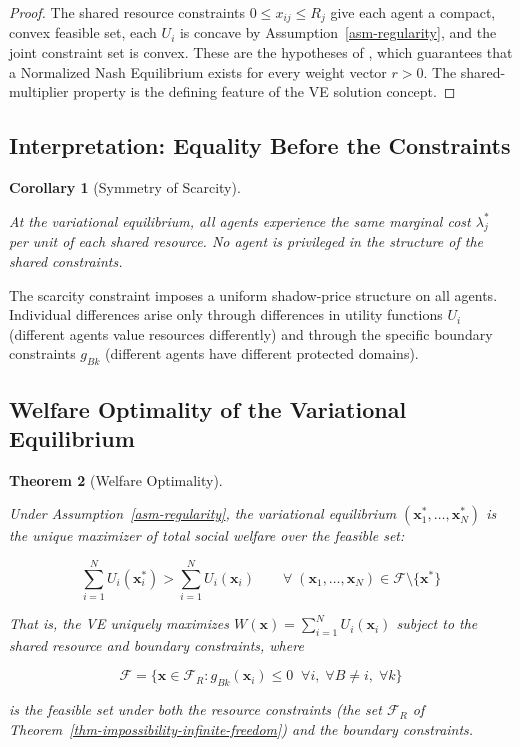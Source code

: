 \documentclass[11pt]{article}
\theoremstyle{plain}
\newtheorem{theorem}{Theorem}
\newtheorem{corollary}[theorem]{Corollary}
\theoremstyle{definition}
\theoremstyle{remark}
\let\origsubsection\subsection
\renewcommand{\subsection}{\needspace{7\baselineskip}\origsubsection}
\begin{document}
\begin{proof}
The shared resource constraints $0 \leq x_{ij} \leq R_j$ give each agent a compact, convex feasible set, each $U_i$ is concave by Assumption~\ref{asm-regularity}, and the joint constraint set is convex. These are the hypotheses of \citep[Theorem 3]{Rosen1965}, which guarantees that a Normalized Nash Equilibrium exists for every weight vector $r > 0$. The shared-multiplier property is the defining feature of the VE solution concept.
\end{proof}

\subsection{Interpretation: Equality Before the
Constraints}\label{interpretation-equality-before-the-constraints}

\begin{corollary}[Symmetry of Scarcity]
\label{cor-symmetry-scarcity}

At the variational equilibrium, all agents experience the same marginal cost $\lambda_j^*$ per unit of each shared resource. No agent is privileged in the structure of the shared constraints.
\end{corollary}

The scarcity constraint imposes a uniform shadow-price structure on all
agents. Individual differences arise only through differences in utility
functions \(U_i\) (different agents value resources differently) and
through the specific boundary constraints \(g_{Bk}\) (different agents
have different protected domains).

\subsection{Welfare Optimality of the Variational
Equilibrium}\label{welfare-optimality-of-the-variational-equilibrium}

\begin{theorem}[Welfare Optimality]
\label{thm-welfare-optimality}

Under Assumption~\ref{asm-regularity}, the variational equilibrium $(\mathbf{x}_1^*, \ldots, \mathbf{x}_N^*)$ is the unique maximizer of total social welfare over the feasible set:

$$\sum_{i=1}^{N} U_i(\mathbf{x}_i^*) > \sum_{i=1}^{N} U_i(\mathbf{x}_i) \qquad \forall \; (\mathbf{x}_1, \ldots, \mathbf{x}_N) \in \mathcal{F} \setminus \{\mathbf{x}^*\}$$

That is, the VE uniquely maximizes $W(\mathbf{x}) = \sum_{i=1}^{N} U_i(\mathbf{x}_i)$ subject to the shared resource and boundary constraints, where

$$\mathcal{F} = \{\mathbf{x} \in \mathcal{F}_R : g_{Bk}(\mathbf{x}_i) \leq 0 \;\; \forall i, \; \forall B \neq i, \; \forall k\}$$

is the feasible set under both the resource constraints (the set $\mathcal{F}_R$ of Theorem~\ref{thm-impossibility-infinite-freedom}) and the boundary constraints.
\end{theorem}
\end{document}
